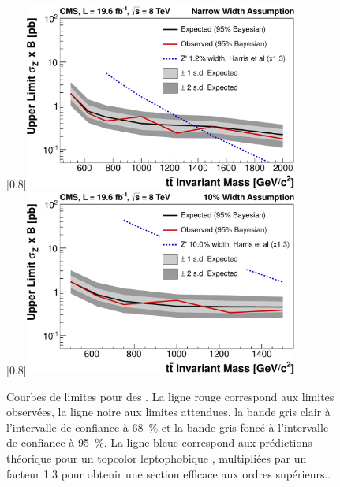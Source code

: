 \begin{figure}[tbp] \centering
    [0.8\textwidth]{\includegraphics[width=0.8\textwidth]{chapitre7/figs/limits_narrow.pdf}} \\ \vspace{5mm}
    [0.8\textwidth]{\includegraphics[width=0.8\textwidth]{chapitre7/figs/limits_large.pdf}}
    \caption{Courbes de limites pour des \zprime. La ligne rouge correspond aux limites observées, la ligne noire aux limites attendues, la bande gris clair à l'intervalle de confiance à \SI{68}{\percent} et la bande gris foncé à l'intervalle de confiance à \SI{95}{\%}. La ligne bleue correspond aux prédictions théorique pour un \zprime topcolor leptophobique \citep{Harris:2011ez}, multipliées par un facteur \num{1.3} pour obtenir une section efficace aux ordres supérieurs..}
    \label{fig:limits_zprime}
\end{figure}

